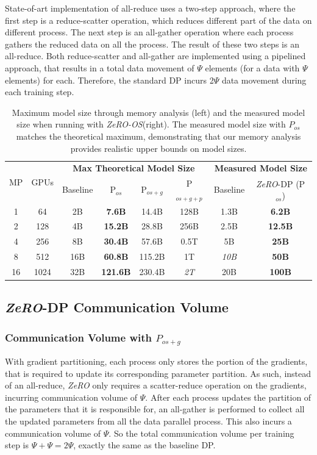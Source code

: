 \documentclass{article}
\newcommand{\name}{\emph{ZeRO}\xspace}
\newcommand{\nameos}{\emph{ZeRO-OS}\xspace}
\begin{document}
State-of-art implementation of all-reduce uses a two-step approach, where the first step is a reduce-scatter operation, which reduces different part of the data on different process. The next step is an all-gather operation where each process gathers the reduced data on all the process. The result of these two steps is an all-reduce.
Both reduce-scatter and all-gather are implemented using a pipelined approach, that results in a total data movement of $\Psi$ elements (for a data with $\Psi$ elements) for each. Therefore, the standard DP incurs 2$\Psi$ data movement during each training step.
 \begin{table}
        \centering
            \begin{tabular}{|c|c||c|c|c|c||c|c|}
            \hline
            \multicolumn{1}{|c}{\multirow{2}{*}{MP}}&\multicolumn{1}{|c}{\multirow{2}{*}{GPUs}}  & \multicolumn{4}{||c|}{\bf Max Theoretical Model Size}&\multicolumn{2}{|c|}{\bf Measured Model Size} \\
            \hhline{~~------}
            &&Baseline&P$_{os}$&P$_{os+g}$&P$_{os+g+p}$&Baseline&\name-DP (P$_{os}$)\\
            \hline
            1&64&2B&\bf{7.6B}&14.4B&128B&1.3B&\bf{6.2B}\\
            \hline
            2&128&4B&\bf{15.2B}&28.8B&256B&2.5B&\bf{12.5B}\\
            \hline
            4&256&8B&\bf{30.4B}&57.6B&0.5T&5B&\bf{25B}\\
            \hline
            8&512&16B&\bf{60.8B}&115.2B&1T&\it{10B}&\bf{50B}\\
            \hline
            16&1024&32B&\bf{121.6B}&230.4B&\it{2T}&20B&\bf{100B}\\
            \hline
            \end{tabular}
        
     \caption{Maximum model size through memory analysis (left) and the measured model size when running with \nameos (right). The measured model size with $P_{os}$ matches the theoretical maximum, demonstrating that our memory analysis provides realistic upper bounds on model sizes.}
     \label{tab:largest-model}
 \end{table}
\subsection{\name-DP Communication Volume}
\subsubsection{Communication Volume with $P_{os+g}$} 
With gradient partitioning, each process only stores the portion of the gradients, that is required to update its corresponding parameter partition. As such, instead of an all-reduce, \name only requires a scatter-reduce operation on the gradients, incurring communication volume of $\Psi$.  After each process updates the partition of the parameters that it is responsible for, an all-gather is performed to collect all the updated parameters from all the data parallel process. This also incurs a communication volume of $\Psi$. So the total communication volume per training step is $\Psi+\Psi= 2\Psi$, exactly the same as the baseline DP.
\end{document}
